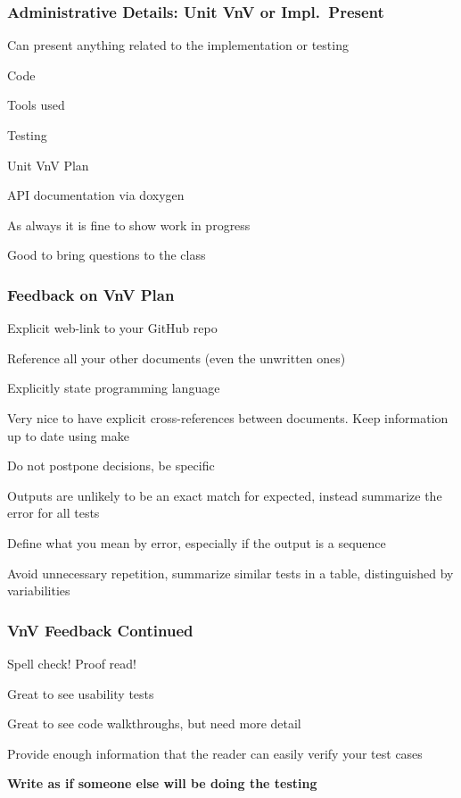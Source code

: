 \documentclass[t,12pt,numbers,fleqn]{beamer}
\begin{document}

\begin{frame}
\frametitle{Administrative Details: Unit VnV or Impl.\ Present}

Can present anything related to the implementation or testing
\bi
\item Code
\item Tools used
\item Testing
\item Unit VnV Plan
\item API documentation via doxygen
\item As always it is fine to show work in progress
\item Good to bring questions to the class
\ei

\end{frame}


\begin{frame}
\frametitle{Feedback on VnV Plan}

\bi
\item Explicit web-link to your GitHub repo
\item Reference all your other documents (even the unwritten ones)
\item Explicitly state programming language
\item Very nice to have explicit cross-references between documents.  Keep
  information up to date using make
\item Do not postpone decisions, be specific
\item Outputs are unlikely to be an exact match for expected, instead summarize
  the error for all tests
\item Define what you mean by error, especially if the output is a sequence
\item Avoid unnecessary repetition, summarize similar tests in a table,
  distinguished by variabilities
\ei

\end{frame}


\begin{frame}
\frametitle{VnV Feedback Continued}

\bi
\item Spell check!  Proof read!
\item Great to see usability tests%
\item Great to see code walkthroughs, but need more detail
\item Provide enough information that the reader can easily verify your test cases%
\item \textbf{Write as if someone else will be doing the testing}
\ei

\end{frame}
\end{document}
